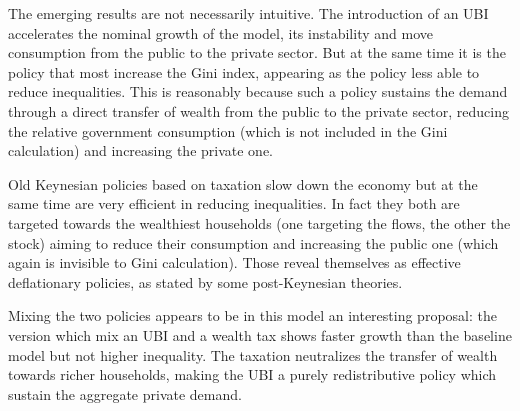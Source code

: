 \documentclass[]{article}
\begin{document}
The emerging results are not necessarily intuitive.
The introduction of an UBI accelerates the nominal growth of the model, its instability and move consumption from the public to the private sector.
But at the same time it is the policy that most increase the Gini index, appearing as the policy less able to reduce inequalities.
This is reasonably because such a policy sustains the demand through a direct transfer of wealth from the public to the private sector, reducing the relative government consumption (which is not included in the Gini calculation) and increasing the private one.

Old Keynesian policies based on taxation slow down the economy but at the same time are very efficient in reducing inequalities.
In fact they both are targeted towards the wealthiest households (one targeting the flows, the other the stock) aiming to reduce their consumption and increasing the public one (which again is invisible to Gini calculation).
Those reveal themselves as effective deflationary policies, as stated by some post-Keynesian theories.

Mixing the two policies appears to be in this model an interesting proposal: the version which mix an UBI and a wealth tax shows faster growth than the baseline model but not higher inequality.
The taxation neutralizes the transfer of wealth towards richer households, making the UBI a purely redistributive policy which sustain the aggregate private demand.


\begin{refcontext}[sorting=nyt]
    \printbibliography
\end{refcontext}

\appendix
{}
\end{document}
